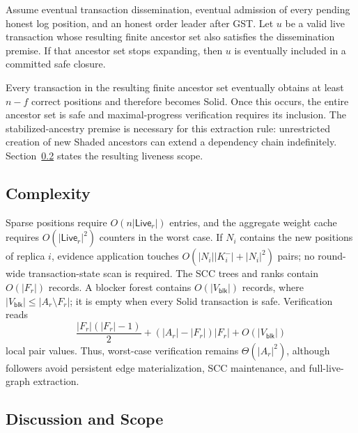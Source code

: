 \begin{proposition}
\label{prop:stabilized-progress-v4}
Assume eventual transaction dissemination, eventual admission of every
pending honest log position, and an honest order leader after GST.  Let $u$ be
a valid live transaction whose resulting finite ancestor set also satisfies
the dissemination premise.  If that ancestor set stops expanding, then $u$ is
eventually included in a committed safe closure.
\end{proposition}

Every transaction in the resulting finite ancestor set eventually obtains at
least $n-f$ correct positions and therefore becomes Solid.  Once this occurs,
the entire ancestor set is safe and maximal-progress verification requires its
inclusion.  The stabilized-ancestry premise is necessary for this extraction
rule: unrestricted creation of new Shaded ancestors can extend a dependency
chain indefinitely.  Section~\ref{sec:discussion-scope-v4} states the resulting
liveness scope.

\subsection{Complexity}
\label{sec:complexity-v4}

Sparse positions require $O(n|\mathsf{Live}_r|)$ entries, and the aggregate
weight cache requires $O(|\mathsf{Live}_r|^2)$ counters in the worst case.  If
$N_i$ contains the new positions of replica $i$, evidence application touches
$O(|N_i||K_i^-|+|N_i|^2)$ pairs; no round-wide transaction-state scan is
required.  The SCC trees and ranks contain $O(|F_r|)$ records.  A blocker
forest contains $O(|V_{\mathsf{blk}}|)$ records, where
$|V_{\mathsf{blk}}|\le|A_r\setminus F_r|$; it is empty when every Solid
transaction is safe.  Verification reads
\[
 \frac{|F_r|(|F_r|-1)}{2}
 +( |A_r|-|F_r| )|F_r|+O(|V_{\mathsf{blk}}|)
\]
local pair values.  Thus, worst-case verification remains
$\Theta(|A_r|^2)$, although followers avoid persistent edge materialization,
SCC maintenance, and full-live-graph extraction.

\subsection{Discussion and Scope}
\label{sec:discussion-scope-v4}


